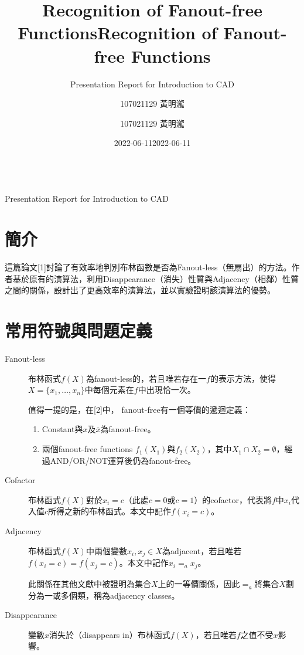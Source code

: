 \documentclass[
  12pt,
  paper=a4,
  ,captions=tableheading
]{scrartcl}
\title{Recognition of Fanout-free Functions}
\subtitle{Presentation Report for Introduction to CAD}
\author{107021129 黃明瀧}
\date{2022-06-11}
\title{Recognition of Fanout-free Functions}
\author{107021129 黃明瀧}
\date{2022-06-11}
\providecommand{\tightlist}{%
  \setlength{\itemsep}{0pt}\setlength{\parskip}{0pt}}
\begin{document}
\vspace*{-1\baselineskip}
{\LARGE \textbf{\thetitle}}\\[0.5\baselineskip]
{\color{gray}\Large Presentation Report for Introduction to
CAD\hfill{\large \theauthor}}
\vspace{-0.5\baselineskip}




\hypertarget{ux7c21ux4ecb}{%
\section{簡介}\label{ux7c21ux4ecb}}

這篇論文{[}1{]}討論了有效率地判別布林函數是否為Fanout-less（無扇出）的方法。作者基於原有的演算法，利用Disappearance（消失）性質與Adjacency（相鄰）性質之間的關係，設計出了更高效率的演算法，並以實驗證明該演算法的優勢。

\hypertarget{ux5e38ux7528ux7b26ux865fux8207ux554fux984cux5b9aux7fa9}{%
\section{常用符號與問題定義}\label{ux5e38ux7528ux7b26ux865fux8207ux554fux984cux5b9aux7fa9}}

\begin{description}
\item[Fanout-less]
布林函式\(f(X)\)為fanout-less的，若且唯若存在一\(f\)的表示方法，使得\(X=\{x_1, \dots, x_n\}\)中每個元素在\(f\)中出現恰一次。

值得一提的是，在{[}2{]}中， fanout-free有一個等價的遞迴定義：

\begin{enumerate}
\def\labelenumi{\arabic{enumi}.}
\tightlist
\item
  Constant與\(x\)及\(\overline{x}\)為fanout-free。
\item
  兩個fanout-free functions
  \(f_1(X_1)\)與\(f_2(X_2)\)，其中\(X_1\cap X_2 = \emptyset\)，經過AND/OR/NOT運算後仍為fanout-free。
\end{enumerate}
\item[Cofactor]
布林函式\(f(X)\)對於\(x_i=c\)（此處\(c=0\)或\(c=1\)）的cofactor，代表將\(f\)中\(x_i\)代入值\(c\)所得之新的布林函式。本文中記作\(f(x_i=c)\)。
\item[Adjacency]
布林函式\(f(X)\)中兩個變數\(x_i,x_j\in X\)為adjacent，若且唯若\(f(x_i=c) = f(x_j=c)\)。本文中記作\(x_i =_a x_j\)。

此關係在其他文獻中被證明為集合\(X\)上的一等價關係，因此\(=_a\)將集合\(X\)劃分為一或多個類，稱為adjacency
classes。
\item[Disappearance]
變數\(x\)消失於（disappears
in）布林函式\(f(X)\)，若且唯若\(f\)之值不受\(x\)影響。
\end{description}
\end{document}
